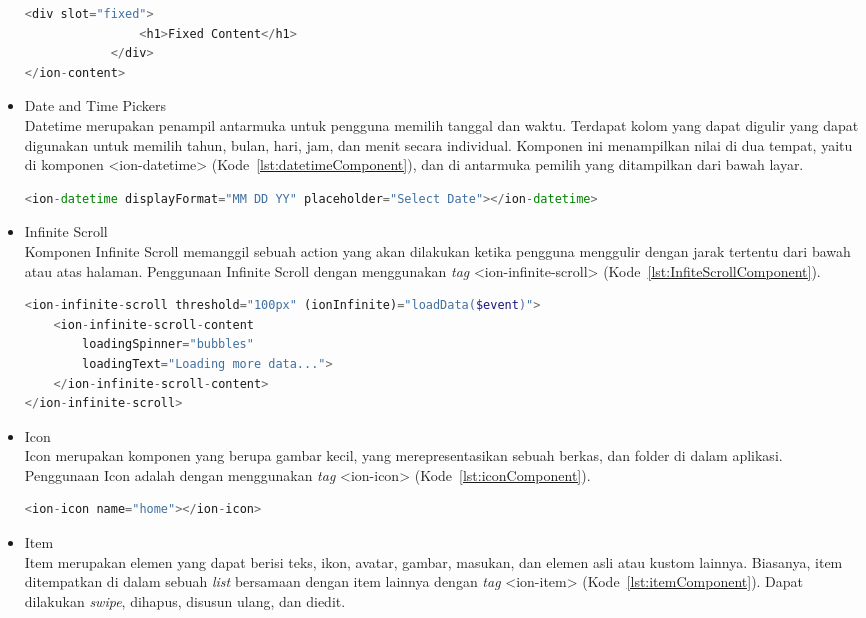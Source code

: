 \begin{itemize}
\begin{lstlisting}[language=php, label={lst:contentComponent}, caption=Potongan Kode Program dari Content Component]
			<div slot="fixed">
				<h1>Fixed Content</h1>
			</div>
</ion-content>
	\end{lstlisting} 
	\item Date and Time Pickers\\
	Datetime merupakan penampil antarmuka untuk pengguna memilih tanggal dan waktu. Terdapat kolom yang dapat digulir yang dapat digunakan untuk memilih tahun, bulan, hari, jam, dan menit secara individual. Komponen ini menampilkan nilai di dua tempat, yaitu di komponen <ion-datetime> (Kode~\ref{lst:datetimeComponent}), dan di antarmuka pemilih yang ditampilkan dari bawah layar.
		\begin{lstlisting}[language=php, label={lst:datetimeComponent}, caption=Kode Program dari Datetime Component dengan Format Bulan-Hari-Tahun]
<ion-datetime displayFormat="MM DD YY" placeholder="Select Date"></ion-datetime>
		\end{lstlisting} 
	\item Infinite Scroll	\\
	Komponen Infinite Scroll memanggil sebuah action yang akan dilakukan ketika pengguna menggulir dengan jarak tertentu dari bawah atau atas halaman. Penggunaan Infinite Scroll dengan menggunakan {\it tag} <ion-infinite-scroll> (Kode~\ref{lst:InfiteScrollComponent}). 
	\begin{lstlisting}[language=php, label={lst:InfiteScrollComponent}, caption=Potongan Kode Program dari Infinite Scroll Component]
<ion-infinite-scroll threshold="100px" (ionInfinite)="loadData($event)">
	<ion-infinite-scroll-content
		loadingSpinner="bubbles"
		loadingText="Loading more data...">
	</ion-infinite-scroll-content>
</ion-infinite-scroll>
	\end{lstlisting}
	\item Icon \\
	Icon merupakan komponen yang berupa gambar kecil, yang merepresentasikan sebuah berkas, dan folder di dalam aplikasi. Penggunaan Icon adalah dengan menggunakan {\it tag} <ion-icon> (Kode~\ref{lst:iconComponent}).
	\begin{lstlisting}[language=php, label={lst:iconComponent}, caption=Potongan Kode Program dari Icon Home]
<ion-icon name="home"></ion-icon>
	\end{lstlisting} 
	\item Item \\
	Item merupakan elemen yang dapat berisi teks, ikon, avatar, gambar, masukan, dan elemen asli atau kustom lainnya. Biasanya, item ditempatkan di dalam sebuah {\it list} bersamaan dengan item lainnya dengan {\it tag} <ion-item> (Kode~\ref{lst:itemComponent}). Dapat dilakukan {\it swipe}, dihapus, disusun ulang, dan diedit.

\end{itemize}

